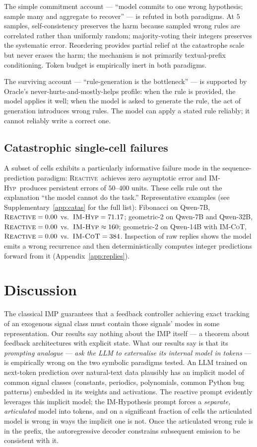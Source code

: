\documentclass{article}
\newcommand{\reactive}{\textsc{Reactive}}
\newcommand{\imhyp}{\textsc{IM-Hyp}}
\newcommand{\imcot}{\textsc{IM-CoT}}
\begin{document}
The simple commitment account --- ``model commits to one wrong
hypothesis; sample many and aggregate to recover'' --- is
refuted in both paradigms.  At $5$ samples, self-consistency
preserves the harm because sampled wrong rules are correlated
rather than uniformly random; majority-voting their integers
preserves the systematic error.  Reordering provides partial
relief at the catastrophe scale but never erases the harm; the
mechanism is not primarily textual-prefix conditioning.  Token
budget is empirically inert in both paradigms.

The surviving account --- ``rule-generation is the bottleneck'' ---
is supported by Oracle's never-hurts-and-mostly-helps profile:
when the rule is provided, the model applies it well; when the
model is asked to generate the rule, the act of generation
introduces wrong rules.  The model can apply a stated rule
reliably; it cannot reliably write a correct one.

\subsection{Catastrophic single-cell failures}

A subset of cells exhibits a particularly informative failure
mode in the sequence-prediction paradigm: \reactive\ achieves
zero asymptotic error and \imhyp\ produces persistent errors of
$50$--$400$ units.  These cells rule out the explanation
``the model cannot do the task.''  Representative examples
(see Supplementary~\ref{app:catas} for the full list):  Fibonacci
on Qwen-7B, $\reactive = 0.00$ vs.\ $\imhyp = 71.17$;
geometric-2 on Qwen-7B and Qwen-32B, $\reactive = 0.00$ vs.\
$\imhyp \approx 160$; geometric-2 on Qwen-14B with \imcot,
$\reactive = 0.00$ vs.\ $\imcot = 384$.  Inspection of raw
replies shows the model emits a wrong recurrence and then
deterministically computes integer predictions forward from it
(Appendix~\ref{app:replies}).

\section{Discussion}
\label{sec:disc}

The classical IMP guarantees that a feedback controller
achieving exact tracking of an exogenous signal class must
contain those signals' modes in some representation.  Our results
say nothing about the IMP itself --- a theorem about feedback
architectures with explicit state.  What our results say is that
its \emph{prompting analogue} --- \emph{ask the LLM to externalise
its internal model in tokens} --- is empirically wrong on the
two symbolic paradigms tested.  An LLM trained on next-token
prediction over natural-text data plausibly has an implicit model
of common signal classes (constants, periodics, polynomials,
common Python bug patterns) embedded in its weights and
activations.  The reactive prompt evidently leverages this
implicit model; the IM-Hypothesis prompt forces a
\emph{separate, articulated} model into tokens, and on a
significant fraction of cells the articulated model is wrong in
ways the implicit one is not.  Once the articulated wrong rule
is in the prefix, the autoregressive decoder constrains
subsequent emission to be consistent with it.
\end{document}

